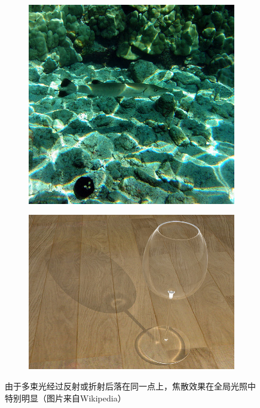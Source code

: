 \begin{figure}
\begin{fullwidth}
\begin{subfigure}[b]{0.2758\thewidth}
	\end{subfigure}	
	\begin{subfigure}[b]{0.19\thewidth}
		\includegraphics[width=1.\textwidth]{figures/intro/Caustics-3}
	\end{subfigure}	
	\begin{subfigure}[b]{0.246\thewidth}
		\includegraphics[width=1.\textwidth]{figures/intro/Caustics-4}
	\end{subfigure}
\caption{由于多束光经过反射或折射后落在同一点上，焦散效果在全局光照中特别明显（图片来自Wikipedia）}
\label{f:intro-caustics}
\end{fullwidth}
\end{figure}

